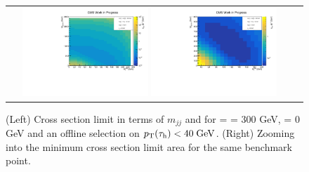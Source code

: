 \begin{figure}[tbh!]
	\centering
	\begin{tabular}{cc}
		\includegraphics[width=0.45\textwidth]{analysis/pics/JetInvMass_vs_MET_xsec_chi300_lsp000_taupt40.pdf}
		\includegraphics[width=0.45\textwidth]{analysis/pics/JetInvMass_vs_MET_xsec_chi300_lsp000_taupt40_zoom.pdf} 		
	\end{tabular}
	\caption{(Left) Cross section limit in terms of $m_{jj}$ and \met for \charginopm = \neutralinotwo = 300 GeV, \neutralinoone = 0 GeV and an offline selection on $p_{\text{T}}(\tau_{\text{h}}) <  40\;\text{Ge}\kern-0.06667em\text{V}$. (Right) Zooming into the minimum cross section limit area for the same benchmark point.}
	\label{fig::JetInvMass_vs_MET_xsec_chi300_lsp000_taupt40}
\end{figure}

